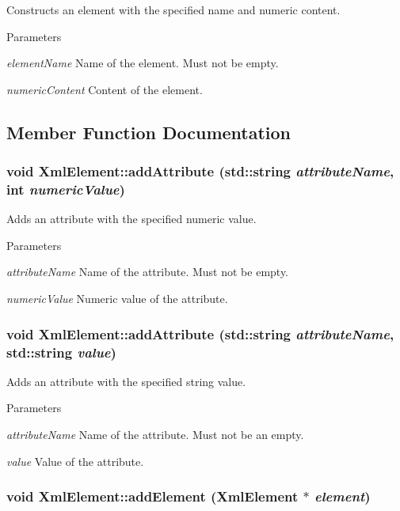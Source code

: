 Constructs an element with the specified name and numeric content. 


\begin{DoxyParams}{Parameters}
\item[{\em elementName}]Name of the element. Must not be empty. \item[{\em numericContent}]Content of the element. \end{DoxyParams}


\subsection{Member Function Documentation}
\hypertarget{classXmlElement_aec69fb49cf9e563cff9858ddc818f055}{
\subsubsection[{addAttribute}]{\setlength{\rightskip}{0pt plus 5cm}void XmlElement::addAttribute (std::string {\em attributeName}, \/  int {\em numericValue})}}
\label{classXmlElement_aec69fb49cf9e563cff9858ddc818f055}


Adds an attribute with the specified numeric value. 


\begin{DoxyParams}{Parameters}
\item[{\em attributeName}]Name of the attribute. Must not be empty. \item[{\em numericValue}]Numeric value of the attribute. \end{DoxyParams}
\hypertarget{classXmlElement_a14387be9ca6d014a38e95a7aa98f86c5}{
\subsubsection[{addAttribute}]{\setlength{\rightskip}{0pt plus 5cm}void XmlElement::addAttribute (std::string {\em attributeName}, \/  std::string {\em value})}}
\label{classXmlElement_a14387be9ca6d014a38e95a7aa98f86c5}


Adds an attribute with the specified string value. 


\begin{DoxyParams}{Parameters}
\item[{\em attributeName}]Name of the attribute. Must not be an empty. \item[{\em value}]Value of the attribute. \end{DoxyParams}
\hypertarget{classXmlElement_a444321a1de2a7f52994c53f9e6e0d942}{
\subsubsection[{addElement}]{\setlength{\rightskip}{0pt plus 5cm}void XmlElement::addElement ({\bf XmlElement} $\ast$ {\em element})}}
\label{classXmlElement_a444321a1de2a7f52994c53f9e6e0d942}


